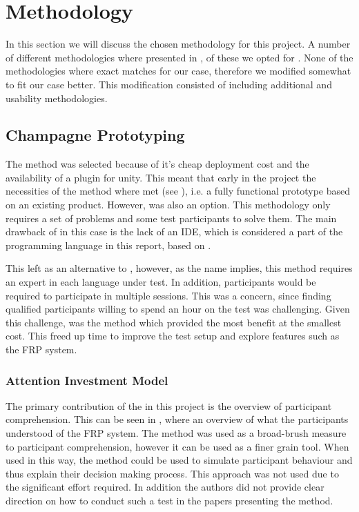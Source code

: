 \section{Methodology}
In this section we will discuss the chosen methodology for this project. A number of different methodologies where presented in , of these we opted for \champagne. None of the methodologies where exact matches for our case, therefore we modified \champagne somewhat to fit our case better. This modification consisted of including additional \attentions and \cognitive usability methodologies.

\subsection{Champagne Prototyping}
The \champagne method was selected because of it's cheap deployment cost and the availability of a \fs plugin for unity\cite{fsharp2019plugin}. This meant that early in the project the necessities of the method where met (see ), i.e. a fully functional prototype based on an existing product. However, \discount was also an option. This methodology only requires a set of problems and some test participants to solve them. The main drawback of \discount in this case is the lack of an \gls{IDE}, which is considered a part of the programming language in this report, based on \cognitive.

This left \expert as an alternative to \champagne, however, as the name implies, this method requires an expert in each language under test. In addition, participants would be required to participate in multiple sessions. This was a concern, since finding qualified participants willing to spend an hour on the test was challenging. Given this challenge, \champagne was the method which provided the most benefit at the smallest cost. This freed up time to improve the test setup and explore features such as the \gls{FRP} system.

\subsubsection{Attention Investment Model}
The primary contribution of the \attention in this project is the overview of participant comprehension. This can be seen in , where an overview of what the participants understood of the \gls{FRP} system. The method was used as a broad-brush measure to participant comprehension, however it can be used as a finer grain tool. When used in this way, the method could be used to simulate participant behaviour and thus explain their decision making process\cite{blackwell2002first}. This approach was not used due to the significant effort required. In addition the authors did not provide clear direction on how to conduct such a test in the papers presenting the method.

